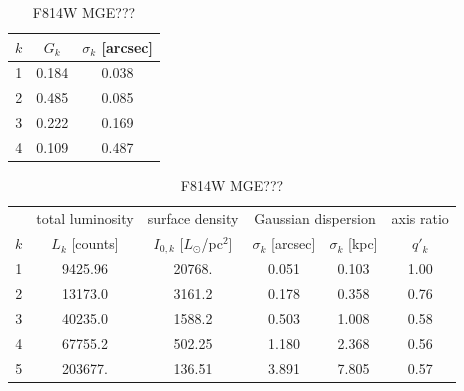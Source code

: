 
\begin{table}
\centering
\begin{minipage}[t]{40mm}
\caption{PSF F814W MGE ??????}
\begin{tabular}{ccc}
\hline
$k$ & $G_k$ & $\sigma_k$ [arcsec] \\\hline
1 & 0.184 & 0.038\\
2 & 0.485 & 0.085\\
3 & 0.222 & 0.169\\
4 & 0.109 & 0.487\\\hline
\end{tabular}
\label{tab:PSFMGEF814W}
\end{minipage}
\hspace{10mm}
\begin{minipage}[t]{100mm}
\caption{F814W MGE???}
\begin{tabular}{cccccc}
\hline
 & total luminosity  & surface density & \multicolumn{2}{c}{Gaussian dispersion} & axis ratio\\
$k$  & $L_k$ [counts] & $I_{0,k}$ [$L_\odot$/pc$^2$] & $\sigma_k$ [arcsec] & $\sigma_k$ [kpc] & $q'_k$\\\hline
1  &     9425.96 &      20768.  &  0.051   & 0.103  & 1.00\\
2  &    13173.0 &        3161.2 &  0.178   & 0.358  & 0.76\\
3  &    40235.0 &        1588.2 &  0.503   & 1.008  & 0.58\\
4  &    67755.2 &         502.25&  1.180   & 2.368  & 0.56\\
5  &    203677. &         136.51&  3.891   & 7.805  & 0.57\\\hline
\end{tabular}
\label{tab:MGEF814W}
\end{minipage}
\end{table}


